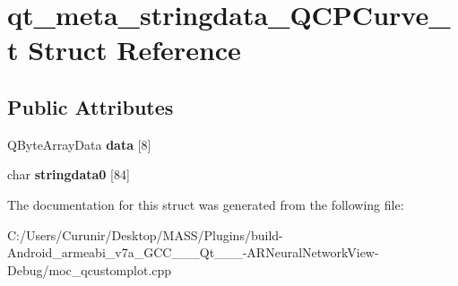 \hypertarget{structqt__meta__stringdata___q_c_p_curve__t}{}\section{qt\+\_\+meta\+\_\+stringdata\+\_\+\+Q\+C\+P\+Curve\+\_\+t Struct Reference}
\label{structqt__meta__stringdata___q_c_p_curve__t}
\subsection*{Public Attributes}
\begin{DoxyCompactItemize}
\item 
\mbox{\label{structqt__meta__stringdata___q_c_p_curve__t_a6c890c6ad50080022cc448d4572a58d8}} 
Q\+Byte\+Array\+Data {\bfseries data} \mbox{[}8\mbox{]}
\item 
\mbox{\label{structqt__meta__stringdata___q_c_p_curve__t_afdf3ad4dbaef5d9bcaa208faa84b4b2b}} 
char {\bfseries stringdata0} \mbox{[}84\mbox{]}
\end{DoxyCompactItemize}


The documentation for this struct was generated from the following file\+:\begin{DoxyCompactItemize}
\item 
C\+:/\+Users/\+Curunir/\+Desktop/\+M\+A\+S\+S/\+Plugins/build-\/\+Android\+\_\+armeabi\+\_\+v7a\+\_\+\+G\+C\+C\+\_\+\_\+\_\+\+Qt\+\_\+\_\+\_-\/\+A\+R\+Neural\+Network\+View-\/\+Debug/moc\+\_\+qcustomplot.\+cpp\end{DoxyCompactItemize}

